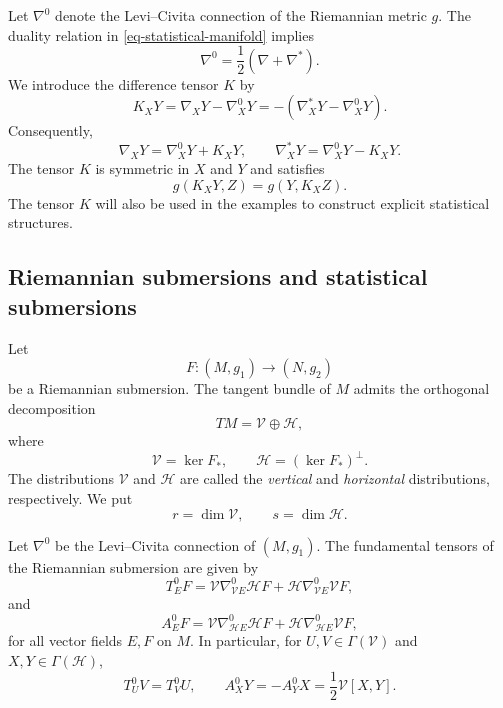 \documentclass[10pt,a4paper]{article}
\theoremstyle{definition}
\theoremstyle{remark}
\numberwithin{equation}{section}
\begin{document}
Let $\nabla^{0}$ denote the Levi--Civita connection of the Riemannian
metric $g$. The duality relation in \eqref{eq-statistical-manifold} implies
\begin{equation}
\nabla^{0}
=
\frac{1}{2}\left(\nabla+\nabla^{*}\right).
\label{eq-LC-stat}
\end{equation}
We introduce the difference tensor $K$ by
\begin{equation}
K_{X}Y
=
\nabla_XY-\nabla^{0}_{X}Y
=
-\left(\nabla^{*}_{X}Y-\nabla^{0}_{X}Y\right).
\label{eq-difference-K}
\end{equation}
Consequently,
\begin{equation}
\nabla_XY
=
\nabla^{0}_{X}Y+K_XY,
\qquad
\nabla^{*}_{X}Y
=
\nabla^{0}_{X}Y-K_XY.
\label{eq-connections-K}
\end{equation}
The tensor $K$ is symmetric in $X$ and $Y$ and satisfies
\begin{equation}
g(K_XY,Z)=g(Y,K_XZ).
\label{eq-K-symmetry}
\end{equation}
The tensor $K$ will also be used in the examples to construct explicit
statistical structures.

\subsection{Riemannian submersions and statistical submersions}

Let
\[
F:(M,g_1)\longrightarrow (N,g_2)
\]
be a Riemannian submersion. The tangent bundle of $M$ admits the
orthogonal decomposition
\begin{equation}
TM=\mathcal V\oplus\mathcal H,
\label{eq-vertical-horizontal}
\end{equation}
where
\[
\mathcal V=\ker F_{*},
\qquad
\mathcal H=(\ker F_{*})^{\perp}.
\]
The distributions $\mathcal V$ and $\mathcal H$ are called the
\emph{vertical} and \emph{horizontal} distributions, respectively. We put
\[
r=\dim\mathcal V,
\qquad
s=\dim\mathcal H.
\]

Let $\nabla^{0}$ be the Levi--Civita connection of $(M,g_1)$. The
fundamental tensors of the Riemannian submersion are given by
\begin{equation}
T^{0}_{E}F
=
\mathcal V\nabla^{0}_{\mathcal VE}\mathcal HF
+
\mathcal H\nabla^{0}_{\mathcal VE}\mathcal VF,
\label{eq-T0}
\end{equation}
and
\begin{equation}
A^{0}_{E}F
=
\mathcal V\nabla^{0}_{\mathcal HE}\mathcal HF
+
\mathcal H\nabla^{0}_{\mathcal HE}\mathcal VF,
\label{eq-A0}
\end{equation}
for all vector fields $E,F$ on $M$. In particular, for
$U,V\in\Gamma(\mathcal V)$ and $X,Y\in\Gamma(\mathcal H)$,
\begin{equation}
T^{0}_{U}V=T^{0}_{V}U,
\qquad
A^{0}_{X}Y=-A^{0}_{Y}X
=
\frac12\mathcal V[X,Y].
\label{eq-T0-A0-properties}
\end{equation}
\end{document}
